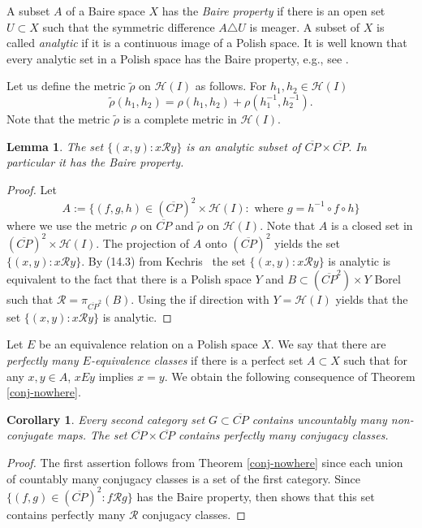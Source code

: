 \documentclass[12pt, a4paper]{amsart}
\newtheorem{lemma}[theorem]{Lemma}
\newtheorem{corollary}[theorem]{Corollary}
\def\R{{\mathcal R}}
\newcommand{\?}{{\bf ???}}
\def\CP{\overline{CP}}
\begin{document}
A subset $A$ of a Baire space $X$ has the {\it Baire property} if there is an open set $U \subset X$ such that the symmetric difference
$A \triangle U$ is meager.
 A subset of $X$ is called {\em analytic} if it is a continuous image of a Polish space. 
It is well known that every analytic set in a Polish space has the Baire property, e.g., see \cite[Theorem 4.3.2]{sriva}.


Let us define the metric $\tilde{\rho}$ on $\mathcal{H}(I)$ as follows. For $h_1,h_2\in \mathcal{H}(I)$ 
\begin{equation*}
\tilde{\rho}(h_1,h_2)=\rho(h_1,h_2)+\rho(h_1^{-1},h_2^{-1}).
\end{equation*}
Note that the metric $\tilde{\rho}$ is a complete metric in $\mathcal{H}(I)$.

\begin{lemma}\label{lem:Rbaire}
The set $\{(x,y): x\mathcal{R}y\}$
is an analytic subset of $\CP\times \CP$. In particular it has the Baire property.
\end{lemma}

\begin{proof}
Let 
$$A:=\{(f,g,h)\in (\CP)^2\times \mathcal{H}(I) : \text{ where }  g=h^{-1}\circ f\circ h \}$$ where we use the metric $\rho$ on $\CP$ and $\tilde{\rho}$ on $\mathcal{H}(I)$.  
Note that $A$ is a closed set in $(\CP)^2\times \mathcal{H}(I)$. 
The 
projection of $A$ onto $(\CP)^2$ yields the set $\{(x,y): x\mathcal{R}y\}$.
By (14.3) from Kechris~\cite{Kechris} 
the set 
$\{(x,y): x\mathcal{R}y\}$
is analytic is equivalent to the fact that there is a Polish space $Y$ and $B\subset (\CP^2)\times Y$ Borel such that $\mathcal{R}=\pi_{\CP^2}(B)$. Using the if direction
with $Y = \mathcal{H}(I)$ yields that the set
$\{(x,y): x\mathcal{R}y\}$ is analytic.
\end{proof}

Let $E$ be an equivalence relation on a Polish space $X$. We say that there
are {\it perfectly many $E$-equivalence classes} if there is a perfect set $A\subset X$ such that for any $x,y\in A$, $xEy$ implies $x = y$.
We obtain the following 
consequence of Theorem \ref{conj-nowhere}.

\begin{corollary}\label{cor:conjugacyclasses}
Every second category set $G\subset \CP$ contains uncountably many non-conjugate maps. The set $\CP \times \CP$
contains perfectly many conjugacy classes. 
\end{corollary}

\begin{proof}  The first assertion follows from Theorem \ref{conj-nowhere} since
each union of countably many conjugacy classes is a set of the first category. 
Since $\{(f,g) \in (\CP)^2: f\R g\}$  has the Baire property, then \cite[Corollary 5.3.3]{SG} shows that
this set contains perfectly many $\R$ conjugacy classes.
\end{proof}
\end{document}
